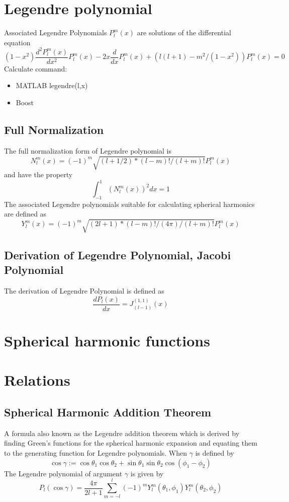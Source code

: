 \documentclass[•]{article}
\begin{document}
\section{Legendre polynomial}
Associated Legendre Polynomials $P_l^m(x)$ are solutions of the differential equation
\begin{equation}
(1 - x^2) \frac{d^2 P_l^m(x)}{ dx^2 }P_l^m(x) - 2x \frac{d}{dx
} P_l^m(x) +
( l(l+1) - m^2 / (1 - x^2) ) P_l^m(x) = 0
\end{equation}
Calculate command:
\begin{itemize}
\item MATLAB legendre(l,x)
\item Boost 
\end{itemize}

\subsection{Full Normalization}
The full normalization form of Legendre polynomial is
\begin{equation}
N_l^m(x) = (-1)^m \sqrt{(l + 1/2) * (l-m)! / (l+m)!} P_l^m(x)
\end{equation}
and have the property
\begin{equation}
\int_{-1}^1 ( N_l^m(x) )^2 dx = 1
\end{equation}
The associated Legendre polynomials suitable for calculating spherical harmonics are defined as 
\begin{equation}
Y_l^m(x) = (-1)^m \sqrt{(2l + 1) * (l-m)! / (4 \pi) / (l+m)!} P_l^m(x)
\end{equation}
\subsection{Derivation of Legendre Polynomial, Jacobi Polynomial}
The derivation of Legendre Polynomial is defined as
\begin{equation}
\frac{d P_l(x)}{dx} =  J_{(l-1)}^{(1,1)}(x)
\end{equation}
\section{Spherical harmonic functions}
\section{Relations}
\subsection{Spherical Harmonic Addition Theorem}
A formula also known as the Legendre addition theorem which is derived by finding Green's functions for the spherical harmonic expansion and equating them to the generating function for Legendre polynomials. When $\gamma$ is defined by
\begin{equation}
\cos \gamma := \cos \theta_1 \cos \theta_2 + \sin \theta_1 \sin \theta_2 \cos(\phi_1-\phi_2)
\end{equation}
The Legendre polynomial of argument $\gamma$ is given by
\begin{equation}
P_l(\cos \gamma) = \frac{4\pi}{2l+1}\sum_{m=-l}^l (-1)^m Y^m_l(\theta_1,\phi_1) Y^m_l(\theta_2, \phi_2)
\end{equation}
\end{document}
